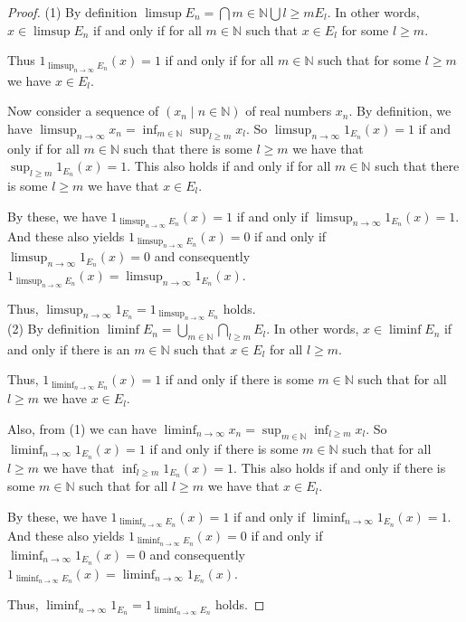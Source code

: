 \documentclass{article}
\newcommand{\mbn}{\mathbb{N}}
\begin{document}
\begin{proof}
    (1) By definition $\limsup E_n = \bigcap{m\in\mbn} \bigcup{l\geq m} E_l$. In other words, $x\in \limsup E_n$ if and only if for all $m\in\mbn$ such that $x\in E_l$ for some $l\geq m$.

    Thus $1_{\limsup_{n\to\infty} E_n} (x) = 1$ if and only if for all $m\in\mbn$ such that for some $l \geq m$ we have $x\in E_l$.

    Now consider a sequence of $(x_n \mid n\in\mbn)$ of real numbers $x_n$. By definition, we have $\limsup_{n\to\infty} x_n = \inf_{m\in\mbn}\sup_{l\geq m} x_l$. So $\limsup_{n\to\infty}1_{E_n}(x) = 1$ if and only if for all $m\in\mbn$ such that there is some $l\geq m$ we have that $\sup_{l\geq m}1_{E_n}(x) = 1$. This also holds if and only if for all $m\in\mbn$ such that there is some $l \geq m$ we have that $x\in E_l$.

    By these, we have $1_{\limsup_{n\to\infty}E_n}(x) = 1$ if and only if $\limsup_{n\to\infty} 1_{E_n}(x) = 1$. And these also yields $1_{\limsup_{n\to\infty}E_n}(x) = 0$ if and only if $\limsup_{n\to\infty} 1_{E_n}(x) = 0$ and consequently $1_{\limsup_{n\to\infty}E_n}(x) = \limsup_{n\to\infty} 1_{E_n}(x)$.

    Thus, $\limsup_{n\to \infty} 1_{E_n} = 1_{\limsup_{n\to\infty} E_n}$ holds.\\

    (2) By definition $\liminf E_n = \bigcup_{m\in\mbn} \bigcap_{l\geq m} E_l$. In other words, $x\in \liminf E_n$ if and only if there is an $m\in\mbn$ such that $x\in E_l$ for all $l\geq m$.

    Thus, $1_{\liminf_{n\to\infty} E_n} (x) = 1$ if and only if there is some $m\in\mbn$ such that for all $l\geq m$ we have $x\in E_l$.

    Also, from (1) we can have $\liminf_{n\to\infty} x_n = \sup_{m\in\mbn}\inf_{l\geq m} x_l$. So $\liminf_{n\to\infty}1_{E_n}(x) = 1$ if and only if there is some $m\in\mbn$ such that for all $l\geq m$ we have that $\inf_{l\geq m}1_{E_n}(x) = 1$. This also holds if and only if there is some $m \in \mbn$ such that for all $l\geq m$ we have that $x\in E_l$.

    By these, we have $1_{\liminf_{n\to\infty}E_n}(x) = 1$ if and only if $\liminf_{n\to\infty} 1_{E_n}(x) = 1$. And these also yields $1_{\liminf_{n\to\infty}E_n}(x) = 0$ if and only if $\liminf_{n\to\infty} 1_{E_n}(x) = 0$ and consequently $1_{\liminf_{n\to\infty}E_n}(x) = \liminf_{n\to\infty} 1_{E_n}(x)$.

    Thus, $\liminf_{n\to \infty} 1_{E_n} = 1_{\liminf_{n\to\infty} E_n}$ holds.

\end{proof}
\end{document}
